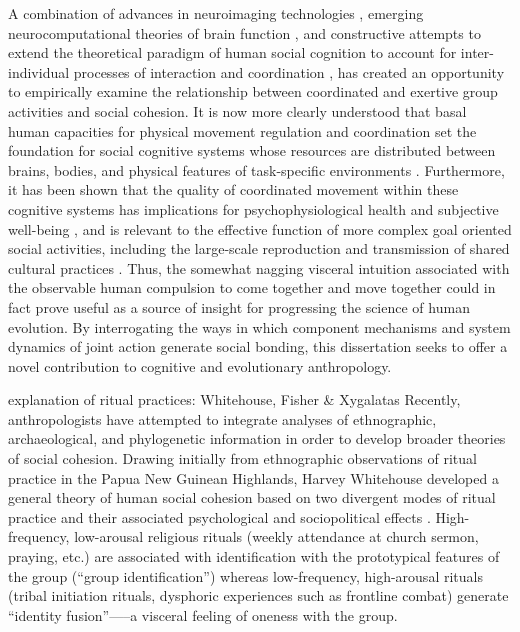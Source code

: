 A combination of advances in neuroimaging technologies \citep{Frith2007}, emerging neurocomputational theories of brain function \citep{Friston2010,Frith2010,Clark2013}, and constructive attempts to extend the theoretical paradigm of human social cognition to account for inter-individual processes of interaction and coordination \citep{Sebanz2006,Dale2014}, has created an opportunity to empirically examine the relationship between coordinated and exertive group activities and social cohesion.  It is now more clearly understood that basal human capacities for physical movement regulation and coordination set the foundation for social cognitive systems whose resources are distributed between brains, bodies, and physical features of task-specific environments \citep{Hutchins2000,Kirsh2006,Semin2008,Semin2012,Coey2012}.  Furthermore, it has been shown that the quality of coordinated movement within these cognitive systems has implications for psychophysiological health and subjective well-being \citep{Wheatley2012}, and is relevant to the effective function of more complex goal oriented social activities, including the large-scale reproduction and transmission of shared cultural practices \citep{Dunbar2012,Roepstorff2010,Claidiere2014,Launay2016}. Thus, the somewhat nagging visceral intuition associated with the observable human compulsion to come together and move together could in fact prove useful as a source of insight for progressing the science of human evolution.  By interrogating the ways in which component mechanisms and system dynamics of joint action generate social bonding, this dissertation seeks to offer a novel contribution to cognitive and evolutionary anthropology.


















explanation of ritual practices: Whitehouse, Fisher & Xygalatas
Recently, anthropologists have attempted to integrate analyses of ethnographic, archaeological, and phylogenetic information in order to develop broader theories of social cohesion. Drawing initially from ethnographic observations of ritual practice in the Papua New Guinean Highlands, Harvey Whitehouse developed a general theory of human social cohesion based on two divergent modes of ritual practice and their associated psychological and sociopolitical effects \citep{Whitehouse1996}. High-frequency, low-arousal religious rituals (weekly attendance at church sermon, praying, etc.) are associated with identification with the prototypical features of the group (“group identification”) whereas low-frequency, high-arousal rituals (tribal initiation rituals, dysphoric experiences such as frontline combat) generate “identity fusion”—--a visceral feeling of oneness with the group.


